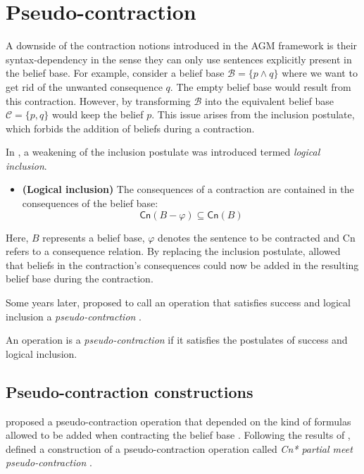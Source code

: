 \section{Pseudo-contraction}

A downside of the contraction notions introduced in the AGM framework \citep{AGM1985} is their syntax-dependency in the sense they can only use sentences explicitly present in the belief base. For example, consider a belief base $\mathcal{B} = \{ p \wedge q \}$ where we want to get rid of the unwanted consequence $q$. The empty belief base would result from this contraction. However, by transforming $\mathcal{B}$ into the equivalent belief base $\mathcal{C} = \{ p, q \}$ would keep the belief $p$. This issue arises from the inclusion postulate, which forbids the addition of beliefs during a contraction. 

In \citet{Hansson1989}, a weakening of the inclusion postulate was introduced termed \textit{logical inclusion}.

\begin{itemize}
    \item[] \textbf{(Logical inclusion)} The consequences of a contraction are contained in the consequences of the belief base:
    $$\textsf{Cn}(B - \varphi) \subseteq \textsf{Cn}(B)$$
\end{itemize}

Here, $B$ represents a belief base, $\varphi$ denotes the sentence to be contracted and \textsf{Cn} refers to a consequence relation. By replacing the inclusion postulate, \citeauthor{Hansson1989} allowed that beliefs in the contraction's consequences could now be added in the resulting belief base during the contraction.

Some years later, \citeauthor{Hansson1993a} proposed to call an operation that satisfies success and logical inclusion a \textit{pseudo-contraction} \citep{Hansson1993a}.

\begin{definition}
    An operation is a \textit{pseudo-contraction} if it satisfies the postulates of success and logical inclusion.
\end{definition}

\subsection{Pseudo-contraction constructions}

\citeauthor{Santos2016} proposed a pseudo-contraction operation that depended on the kind of formulas allowed to be added when contracting the belief base \citep{Santos2016,Santos2018}. Following the results of \citet{Hansson1993a}, \citeauthor{Santos2016} defined a construction of a pseudo-contraction operation called \textit{\textsf{Cn*} partial meet pseudo-contraction} \citep{Santos2016}.


